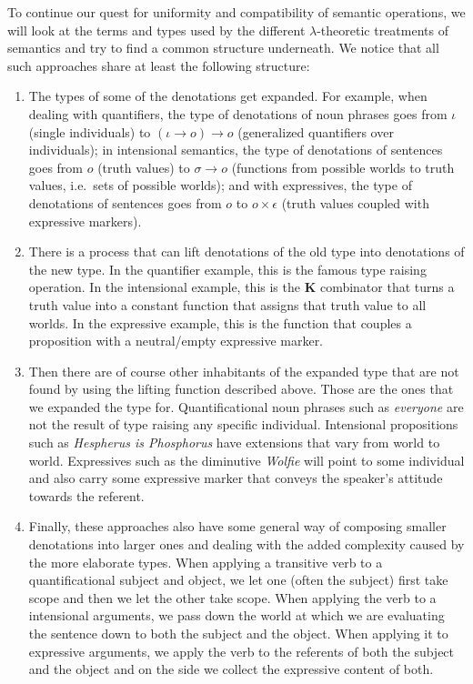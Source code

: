 To continue our quest for uniformity and compatibility of semantic
operations, we will look at the terms and types used by the different
$\lambda$-theoretic treatments of semantics and try to find a common
structure underneath. We notice that all such approaches share at least the
following structure:

\begin{enumerate}
\item \label{item:type-transformation} The types of some of the denotations
  get expanded. For example, when dealing with quantifiers, the type of
  denotations of noun phrases goes from $\iota$ (single individuals) to
  $(\iota \to o) \to o$ (generalized quantifiers over individuals); in
  intensional semantics, the type of denotations of sentences goes from $o$
  (truth values) to $\sigma \to o$ (functions from possible worlds to truth
  values, i.e.\ sets of possible worlds); and with expressives, the type of
  denotations of sentences goes from $o$ to $o \times \epsilon$ (truth
  values coupled with expressive markers).
\item \label{item:monad-eta} There is a process that can lift denotations
  of the old type into denotations of the new type. In the quantifier
  example, this is the famous type raising operation. In the intensional
  example, this is the $\textbf{K}$ combinator that turns a truth value
  into a constant function that assigns that truth value to all worlds. In
  the expressive example, this is the function that couples a proposition
  with a neutral/empty expressive marker.
\item Then there are of course other inhabitants of the expanded type that
  are not found by using the lifting function described above. Those are
  the ones that we expanded the type for. Quantificational noun phrases
  such as \emph{everyone} are not the result of type raising any specific
  individual. Intensional propositions such as \emph{Hespherus is
    Phosphorus} have extensions that vary from world to world. Expressives
  such as the diminutive \emph{Wolfie} will point to some individual and
  also carry some expressive marker that conveys the speaker's attitude
  towards the referent.
\item \label{item:monad-mu} Finally, these approaches also have some
  general way of composing smaller denotations into larger ones and dealing
  with the added complexity caused by the more elaborate types. When
  applying a transitive verb to a quantificational subject and object, we
  let one (often the subject) first take scope and then we let the other
  take scope. When applying the verb to a intensional arguments, we pass
  down the world at which we are evaluating the sentence down to both the
  subject and the object. When applying it to expressive arguments, we
  apply the verb to the referents of both the subject and the object and on
  the side we collect the expressive content of both.
\end{enumerate}

